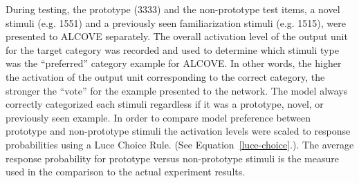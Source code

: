 \documentclass[man]{apa}
\begin{document}
During testing, the prototype (3333) and the non-prototype test items, a novel stimuli (e.g. 1551) and a previously seen familiarization stimuli (e.g. 1515), were presented to ALCOVE separately.  The overall activation level of the output unit for the target category was recorded and used to determine which stimuli type was the ``preferred'' category example for ALCOVE.  In other words, the higher the activation of the output unit corresponding to the correct category, the stronger the ``vote'' for the example presented to the network.  The model always correctly categorized each stimuli regardless if it was a prototype, novel, or previously seen example. In order to compare model preference between prototype and non-prototype stimuli the activation levels were scaled to response probabilities using a Luce Choice Rule. (See Equation~\ref{luce-choice}.).  The average response probability for prototype versus non-prototype stimuli is the measure used in the comparison to the actual experiment results. 
\end{document}
